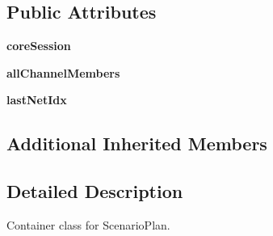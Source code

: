 \subsection*{Public Attributes}
\begin{DoxyCompactItemize}
\item 
\hypertarget{classcore_1_1misc_1_1xmlwriter1_1_1_scenario_plan_aecac8f72fcc2e6db2700d93531c73ced}{{\bfseries core\+Session}}\label{classcore_1_1misc_1_1xmlwriter1_1_1_scenario_plan_aecac8f72fcc2e6db2700d93531c73ced}

\item 
\hypertarget{classcore_1_1misc_1_1xmlwriter1_1_1_scenario_plan_a28195ca25f35406055254345b4790211}{{\bfseries all\+Channel\+Members}}\label{classcore_1_1misc_1_1xmlwriter1_1_1_scenario_plan_a28195ca25f35406055254345b4790211}

\item 
\hypertarget{classcore_1_1misc_1_1xmlwriter1_1_1_scenario_plan_a7002bd4bc59c2eb795e155d25598634d}{{\bfseries last\+Net\+Idx}}\label{classcore_1_1misc_1_1xmlwriter1_1_1_scenario_plan_a7002bd4bc59c2eb795e155d25598634d}

\end{DoxyCompactItemize}
\subsection*{Additional Inherited Members}


\subsection{Detailed Description}
\begin{DoxyVerb}Container class for ScenarioPlan.
\end{DoxyVerb}
 

